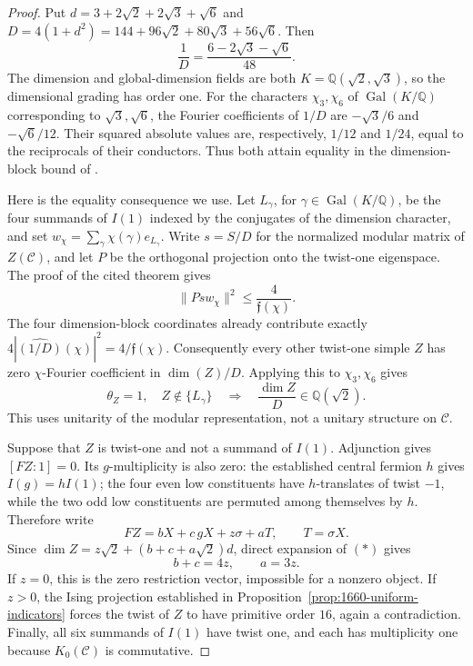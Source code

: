 \begin{proof}
Put $d=3+2\sqrt2+2\sqrt3+\sqrt6$ and
$D=4(1+d^2)=144+96\sqrt2+80\sqrt3+56\sqrt6$. Then
\[
 \frac1D=\frac{6-2\sqrt3-\sqrt6}{48}.
\]
The dimension and global-dimension fields are both
$K=\mathbb Q(\sqrt2,\sqrt3)$, so the dimensional grading has order one.
For the characters $\chi_3,\chi_6$ of $\operatorname{Gal}(K/\mathbb Q)$
corresponding to $\sqrt3,\sqrt6$, the Fourier coefficients of $1/D$ are
$-\sqrt3/6$ and $-\sqrt6/12$. Their squared absolute values are,
respectively, $1/12$ and $1/24$, equal to the reciprocals of their
conductors. Thus both attain equality in the dimension-block bound
of \cite[Theorem~5.1]{SchDimensionBlock}.

Here is the equality consequence we use. Let $L_\gamma$, for
$\gamma\in\operatorname{Gal}(K/\mathbb Q)$, be the four summands of
$I(1)$ indexed by the conjugates of the dimension character, and set
$w_\chi=\sum_\gamma\chi(\gamma)e_{L_\gamma}$. Write $s=S/D$ for the normalized modular matrix of $Z(\mathcal C)$,
and let $P$ be the orthogonal projection onto the twist-one eigenspace.
The proof of the cited theorem gives
\[
 \|Psw_\chi\|^2\leq\frac{4}{\mathfrak f(\chi)}.
\]
The four dimension-block coordinates already contribute exactly
$4|\widehat{(1/D)}(\chi)|^2=4/\mathfrak f(\chi)$.
Consequently every other twist-one simple $Z$ has zero $\chi$-Fourier
coefficient in $\dim(Z)/D$. Applying this to $\chi_3,\chi_6$ gives
\[
 \theta_Z=1,\quad Z\notin\{L_\gamma\}
 \quad\Longrightarrow\quad \frac{\dim Z}{D}\in\mathbb Q(\sqrt2).
 \tag{*}
\]
This uses unitarity of the modular representation, not a unitary
structure on $\mathcal C$.

Suppose that $Z$ is twist-one and not a summand of $I(1)$.
Adjunction gives $[FZ:1]=0$. Its $g$-multiplicity is also zero:
the established central fermion $h$ gives $I(g)=hI(1)$; the four even
low constituents have $h$-translates of twist $-1$, while the two odd
low constituents are permuted among themselves by $h$.
Therefore write
\[
 FZ=bX+c\,gX+z\sigma+aT,\qquad T=\sigma X.
\]
Since $\dim Z=z\sqrt2+(b+c+a\sqrt2)d$, direct expansion of $(*)$ gives
\[
 b+c=4z,\qquad a=3z.
\]
If $z=0$, this is the zero restriction vector, impossible for a
nonzero object. If $z>0$, the Ising projection established in
Proposition~\ref{prop:1660-uniform-indicators} forces the twist of $Z$
to have primitive order $16$, again a contradiction.
Finally, all six summands of $I(1)$ have twist one, and each has
multiplicity one because $K_0(\mathcal C)$ is commutative.
\end{proof}

